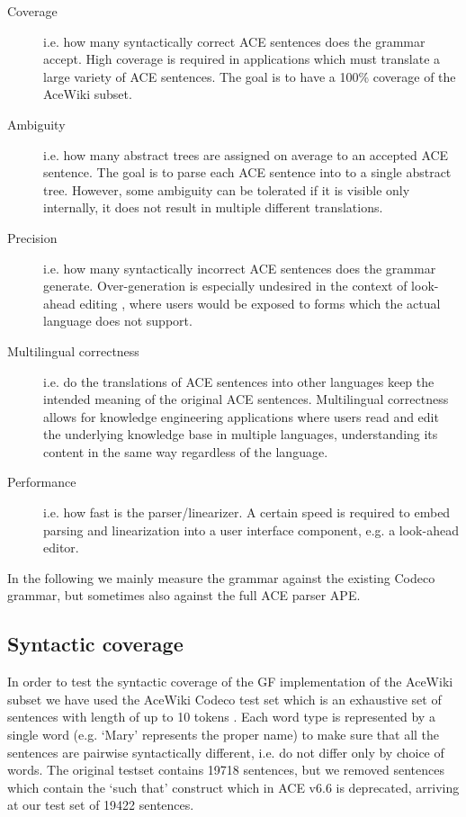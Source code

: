 \documentclass[a4paper]{article}
\begin{document}
\begin{description}
\item[Coverage]
i.e. how many syntactically correct ACE sentences does the grammar accept.
High coverage is required in applications which must translate a large variety
of ACE sentences. The goal is to have a 100\% coverage of the AceWiki subset.

\item[Ambiguity]
i.e. how many abstract trees are assigned on average to an accepted ACE
sentence. The goal is to parse each ACE sentence into to a single abstract
tree. However, some ambiguity can be tolerated if it is visible only internally,
it does not result in multiple different translations.

\item[Precision]
i.e. how many syntactically incorrect ACE sentences does the grammar generate.
Over-generation is especially undesired in the context of look-ahead editing
\cite{schwitter:eamt-claw2003}, where users would be exposed to
forms which the actual language does not support.

\item[Multilingual correctness]
i.e. do the translations of ACE sentences into other languages keep the
intended meaning of the original ACE sentences. Multilingual correctness allows
for knowledge engineering applications where users read and edit the underlying
knowledge base in multiple languages, understanding its content in the same
way regardless of the language.

\item[Performance]
i.e. how fast is the parser/linearizer. A certain speed is required to embed
parsing and linearization into a user interface component, e.g. a look-ahead
editor.
\end{description}

In the following we mainly measure the grammar against the existing
Codeco grammar, but sometimes also against the full ACE parser APE.

\subsection{Syntactic coverage}

In order to test the syntactic coverage of the GF implementation of the
AceWiki subset we have used the AceWiki Codeco test set which
is an exhaustive set of sentences with length of up to 10
tokens \cite{kuhn2010doctoralthesis}. Each word
type is represented by a single word (e.g. `Mary' represents the proper name)
to make sure that all the sentences are pairwise syntactically different, i.e.
do not differ only by choice of words.
The original testset contains 19718 sentences, but we removed sentences which
contain the `such that' construct which in ACE v6.6 is deprecated,
arriving at our test set of 19422 sentences.
\end{document}
